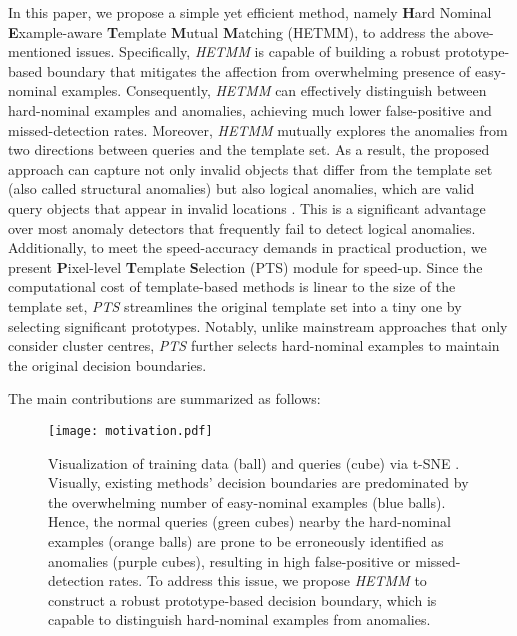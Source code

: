 \documentclass[default,iicol]{sn-jnl}\usepackage[algo2e,ruled,linesnumbered]{algorithm2e}
\theoremstyle{thmstyleone}\newtheorem{theorem}{Theorem}\newtheorem{proposition}[theorem]{Proposition}
\theoremstyle{thmstyletwo}\newtheorem{example}{Example}\newtheorem{remark}{Remark}
\theoremstyle{thmstylethree}\newtheorem{definition}{Definition}
\begin{document}
In this paper, we propose a simple yet efficient method, namely \textbf{H}ard Nominal \textbf{E}xample-aware \textbf{T}emplate \textbf{M}utual \textbf{M}atching (HETMM), to address the above-mentioned issues.
Specifically, \textit{HETMM} is capable of building a robust prototype-based boundary that mitigates the affection from overwhelming presence of easy-nominal examples.
Consequently, \textit{HETMM} can effectively distinguish between hard-nominal examples and anomalies, achieving much lower false-positive and missed-detection rates.
Moreover, \textit{HETMM} mutually explores the anomalies from two directions between queries and the template set.
As a result, the proposed approach can capture not only invalid objects that differ from the template set (also called structural anomalies) but also logical anomalies, which are valid query objects that appear in invalid locations \cite{MVTECLOCO}.
This is a significant advantage over most anomaly detectors that frequently fail to detect logical anomalies.
Additionally, to meet the speed-accuracy demands in practical production, we present \textbf{P}ixel-level \textbf{T}emplate \textbf{S}election (PTS) module for speed-up.
Since the computational cost of template-based methods is linear to the size of the template set, \textit{PTS} streamlines the original template set into a tiny one by selecting significant prototypes.
Notably, unlike mainstream approaches that only consider cluster centres, \textit{PTS} further selects hard-nominal examples to maintain the original decision boundaries.

The main contributions are summarized as follows:

\begin{figure}[!t]
    \centering
    \texttt{[image: motivation.pdf]}
    \caption{
    Visualization of training data (ball) and queries (cube) via t-SNE \cite{tsne}.
    Visually, existing methods' decision boundaries are predominated by the overwhelming number of easy-nominal examples (blue balls).
    Hence, the normal queries (green cubes) nearby the hard-nominal examples (orange balls) are prone to be erroneously identified as anomalies (purple cubes), resulting in high false-positive or missed-detection rates.
    To address this issue, we propose \textit{HETMM} to construct a robust prototype-based decision boundary, which is capable to distinguish hard-nominal examples from anomalies.
    }
    \label{fig:motivation}
\end{figure}
\end{document}
